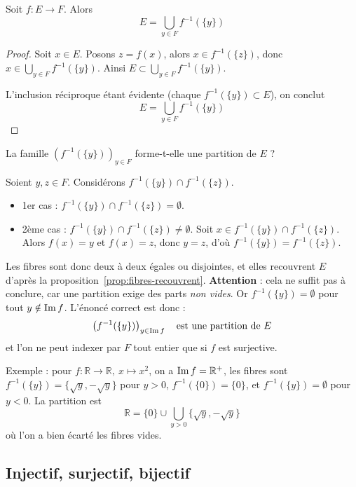 \begin{prop}
\label{prop:fibres-recouvrent}
Soit $f:E\to F$. Alors
\[E = \bigcup_{y\in F} f^{-1}(\{y\})\]
\end{prop}

\begin{proof}
Soit $x\in E$. Posons $z=f(x)$, alors $x\in f^{-1}(\{z\})$, donc $x\in \displaystyle\bigcup_{y\in F} f^{-1}(\{y\})$. Ainsi $E\subset \displaystyle\bigcup_{y\in F}f^{-1}(\{y\})$.

L'inclusion réciproque étant évidente (chaque $f^{-1}(\{y\})\subset E$), on conclut
\[E = \bigcup_{y\in F} f^{-1}(\{y\})\]
\end{proof}

\begin{exemple}
La famille $\left(f^{-1}(\{y\})\right)_{y\in F}$ forme-t-elle une partition de $E$ ?

Soient $y,z\in F$. Considérons $f^{-1}(\{y\})\cap f^{-1}(\{z\})$.
\begin{itemize}
\item 1er cas : $f^{-1}(\{y\})\cap f^{-1}(\{z\}) = \emptyset$.
\item 2ème cas : $f^{-1}(\{y\})\cap f^{-1}(\{z\}) \neq \emptyset$. Soit $x\in f^{-1}(\{y\})\cap f^{-1}(\{z\})$. Alors $f(x)=y$ et $f(x)=z$, donc $y=z$, d'où $f^{-1}(\{y\})=f^{-1}(\{z\})$.
\end{itemize}
Les fibres sont donc deux à deux égales ou disjointes, et elles recouvrent $E$ d'après la proposition~\ref{prop:fibres-recouvrent}. \textbf{Attention} : cela ne suffit pas à conclure, car une partition exige des parts \emph{non vides}. Or $f^{-1}(\{y\})=\emptyset$ pour tout $y\notin \operatorname{Im} f$. L'énoncé correct est donc :
\[\left(f^{-1}(\{y\})\right)_{y\in \operatorname{Im} f} \quad \text{est une partition de } E\]
et l'on ne peut indexer par $F$ tout entier que si $f$ est surjective.

Exemple : pour $f:\mathbb{R}\to\mathbb{R},\ x\mapsto x^2$, on a $\operatorname{Im} f=\mathbb{R}^+$, les fibres sont $f^{-1}(\{y\})=\{\sqrt{y},-\sqrt{y}\}$ pour $y>0$, $f^{-1}(\{0\})=\{0\}$, et $f^{-1}(\{y\})=\emptyset$ pour $y<0$. La partition est
\[\mathbb{R} = \{0\} \cup \bigcup_{y>0}\{\sqrt{y},-\sqrt{y}\}\]
où l'on a bien écarté les fibres vides.
\end{exemple}

\subsection{Injectif, surjectif, bijectif}


